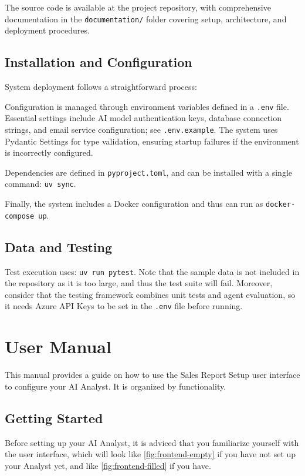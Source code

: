\documentclass[a4paper]{report}
\begin{document}
The source code is available at the project repository, with comprehensive documentation in the \texttt{documentation/} folder covering setup, architecture, and deployment procedures.

\section{Installation and Configuration}

System deployment follows a straightforward process:

Configuration is managed through environment variables defined in a \texttt{.env} file. Essential settings include AI model authentication keys, database connection strings, and email service configuration; see \texttt{.env.example}. The system uses Pydantic Settings for type validation, ensuring startup failures if the environment is incorrectly configured.

Dependencies are defined in \texttt{pyproject.toml}, and can be installed with a single command: \texttt{uv sync}.

Finally, the system includes a Docker configuration and thus can run as
\texttt{docker-compose up}.

\section{Data and Testing}

Test execution uses: \texttt{uv run pytest}. Note that the sample data is not included in the repository as it is too large, and thus the test suite will fail. Moreover, consider that the testing framework combines unit tests and agent evaluation, so it needs Azure API Keys to be set in the \texttt{.env} file before running.

\chapter{User Manual}

This manual provides a guide on how to use the Sales Report Setup user interface to configure your AI Analyst. It is organized by functionality.

\section{Getting Started}

Before setting up your AI Analyst, it is adviced that you familiarize yourself with the user interface, which will look like \autoref{fig:frontend-empty} if you have not set up your Analyst yet, and like \autoref{fig:frontend-filled} if you have.
\end{document}
